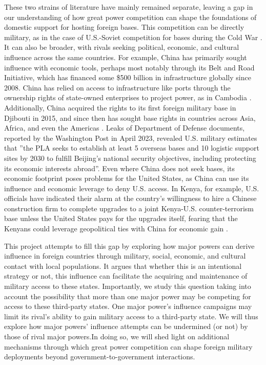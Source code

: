 These two strains of literature have mainly remained separate, leaving a gap in our understanding of how great power competition can shape the foundations of domestic support for hosting foreign bases. This competition can be directly military, as in the case of U.S.-Soviet competition for bases during the Cold War \cite{Nieman2020,Harkavy1982}. It can also be broader, with rivals seeking political, economic, and cultural influence across the same countries. For example, China has primarily sought influence with economic tools, perhaps most notably through its Belt and Road Initiative, which has financed some \$500 billion in infrastructure globally since 2008. China has relied on access to infrastructure like ports through the ownership rights of state-owned enterprises to project power, as in Cambodia \cite{kardon2022,kardon2022pier}. Additionally, China acquired the rights to its first foreign military base in Djibouti in 2015, and since then has sought base rights in countries across Asia, Africa, and even the Americas \cite{hudson2023,strobel2023}. Leaks of Department of Defense documents, reported by the Washington Post in April 2023, revealed U.S. military estimates that ''the PLA seeks to establish at least 5 overseas bases and 10 logistic support sites by 2030 to fulfill Beijing's national security objectives, including protecting its economic interests abroad''\cite{hudson2023}. Even where China does not seek bases, its economic footprint poses problems for the United States, as China can use its influence and economic leverage to deny U.S. access. In Kenya, for example, U.S. officials have indicated their alarm at the country's willingness to hire a Chinese construction firm to complete upgrades to a joint Kenya-U.S. counter-terrorism base unless the United States pays for the upgrades itself, fearing that the Kenyans could leverage geopolitical ties with China for economic gain \cite{philips2023}.

This project attempts to fill this gap by exploring how major powers can derive influence in foreign countries through military, social, economic, and cultural contact with local populations. It argues that whether this is an intentional strategy or not, this influence can facilitate the acquiring and maintenance of military access to these states. Importantly, we study this question taking into account the possibility that more than one major power may be competing for access to these third-party states. One major power's influence campaigns may limit its rival's ability to gain military access to a third-party state. We will thus explore how major powers' influence attempts can be undermined (or not) by those of rival major powers.In doing so, we will shed light on additional mechanisms through which great power competition can shape foreign military deployments beyond government-to-government interactions. 

